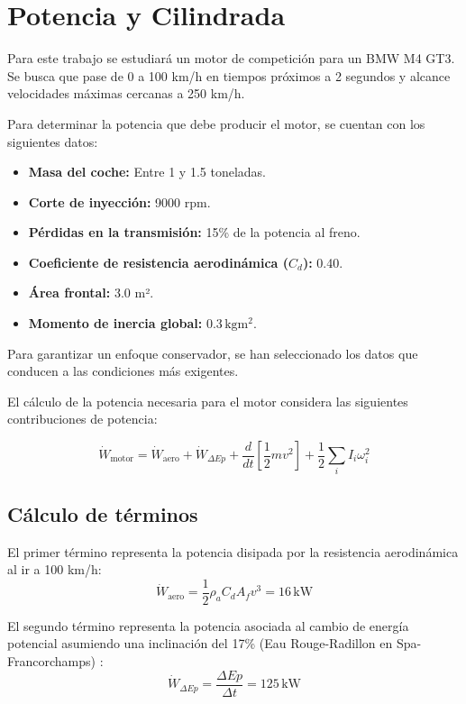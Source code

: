 \section{Potencia y Cilindrada} \label{s:section_01}

Para este trabajo se estudiará un motor de competición para un BMW M4 GT3. Se busca que pase de 0 a 100 km/h en tiempos próximos a 2 segundos y alcance velocidades máximas cercanas a 250 km/h. 

Para determinar la potencia que debe producir el motor, se cuentan con los siguientes datos:

\begin{itemize}
    \item \textbf{Masa del coche:} Entre 1 y 1.5 toneladas.
    \item \textbf{Corte de inyección:} 9000 rpm.
    \item \textbf{Pérdidas en la transmisión:} 15\% de la potencia al freno.
    \item \textbf{Coeficiente de resistencia aerodinámica (\(C_d\)):} 0.40.
    \item \textbf{Área frontal:} 3.0 m².
    \item \textbf{Momento de inercia global:} \( 0.3 \, \text{kg}\text{m}^2 \).
\end{itemize}

Para garantizar un enfoque conservador, se han seleccionado los datos que conducen a las condiciones más exigentes.

El cálculo de la potencia necesaria para el motor considera las siguientes contribuciones de potencia:

\begin{equation}
\dot{W}_{\text{motor}} = \dot{W}_{\text{aero}} + \dot{W}_{\Delta Ep} + \frac{d}{dt} \left[ \frac{1}{2} m v^2 \right] + \frac{1}{2} \sum_{i} I_i \omega_i^2
\end{equation}

\subsection*{Cálculo de términos}

El primer término representa la potencia disipada por la resistencia aerodinámica al ir a 100 km/h:
\[
\dot{W}_{\text{aero}} =  \frac{1}{2}  \rho_a  C_d  A_fv^3 = 16 \, \text{kW}
\]

El segundo término representa la potencia asociada al cambio de energía potencial asumiendo una inclinación del 17\% (Eau Rouge-Radillon en Spa-Francorchamps) : 
\[
\dot{W}_{\Delta Ep} = \frac{\Delta Ep}{\Delta t} = 125 \, \text{kW}
\]


